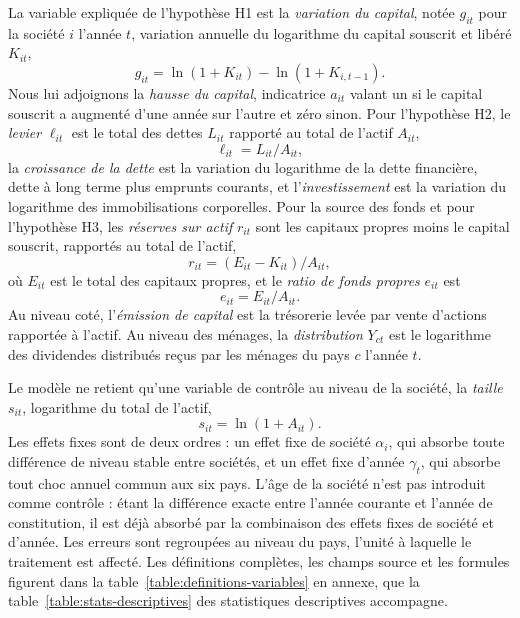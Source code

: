 La variable expliquée de l'hypothèse H1 est la \textit{variation du capital}, notée $g_{it}$ pour la
société $i$ l'année $t$, variation annuelle du logarithme du capital souscrit et libéré $K_{it}$,
\begin{equation}\label{eq:var-capital}
  g_{it} = \ln(1 + K_{it}) - \ln(1 + K_{i,t-1}).
\end{equation}
Nous lui adjoignons la \textit{hausse du capital}, indicatrice $a_{it}$ valant un si le capital
souscrit a augmenté d'une année sur l'autre et zéro sinon. Pour l'hypothèse H2, le \textit{levier}
$\ell_{it}$ est le total des dettes $L_{it}$ rapporté au total de l'actif $A_{it}$,
\begin{equation}\label{eq:levier}
  \ell_{it} = L_{it} / A_{it},
\end{equation}
la \textit{croissance de la dette} est la variation du logarithme de la dette financière, dette à
long terme plus emprunts courants, et l'\textit{investissement} est la variation du logarithme des
immobilisations corporelles. Pour la source des fonds et pour l'hypothèse H3, les \textit{réserves
sur actif} $r_{it}$ sont les capitaux propres moins le capital souscrit, rapportés au total de
l'actif,
\begin{equation}\label{eq:reserves}
  r_{it} = (E_{it} - K_{it}) / A_{it},
\end{equation}
où $E_{it}$ est le total des capitaux propres, et le \textit{ratio de fonds propres} $e_{it}$ est
\begin{equation}\label{eq:fonds-propres}
  e_{it} = E_{it} / A_{it}.
\end{equation}
Au niveau coté, l'\textit{émission de capital} est la trésorerie levée par vente d'actions rapportée
à l'actif. Au niveau des ménages, la \textit{distribution} $Y_{ct}$ est le logarithme des dividendes
distribués reçus par les ménages du pays $c$ l'année $t$.

Le modèle ne retient qu'une variable de contrôle au niveau de la société, la \textit{taille}
$s_{it}$, logarithme du total de l'actif,
\begin{equation}\label{eq:taille}
  s_{it} = \ln(1 + A_{it}).
\end{equation}
Les effets fixes sont de deux ordres : un effet fixe de société $\alpha_i$, qui absorbe toute
différence de niveau stable entre sociétés, et un effet fixe d'année $\gamma_t$, qui absorbe tout
choc annuel commun aux six pays. L'âge de la société n'est pas introduit comme contrôle : étant la
différence exacte entre l'année courante et l'année de constitution, il est déjà absorbé par la
combinaison des effets fixes de société et d'année. Les erreurs sont regroupées au niveau du pays,
l'unité à laquelle le traitement est affecté. Les définitions complètes, les champs source et les
formules figurent dans la table~\ref{table:definitions-variables} en annexe, que la
table~\ref{table:stats-descriptives} des statistiques descriptives accompagne.
